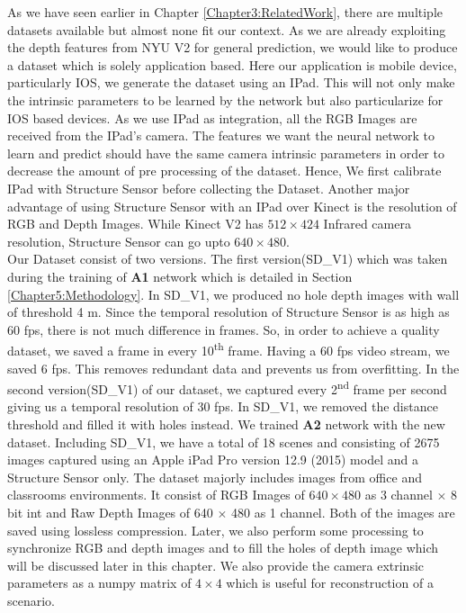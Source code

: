 As we have seen earlier in Chapter \ref{Chapter3:RelatedWork}, there are multiple datasets available but almost none fit our context. As we are already exploiting the depth features from NYU V2 for general prediction, we would like to produce a dataset which is solely application based. Here our application is mobile device, particularly IOS, we generate the dataset using an IPad. This will not only make the intrinsic parameters to be learned by the network but also particularize for IOS based devices. As we use IPad as integration, all the RGB Images are received from the IPad's camera. The features we want the neural network to learn and predict should have the same camera intrinsic parameters in order to decrease the amount of pre processing of the dataset. Hence, We first calibrate IPad with Structure Sensor before collecting the Dataset. Another major advantage of using Structure Sensor with an IPad over Kinect is the resolution of RGB and Depth Images. While Kinect V2 has $512\times424$ Infrared camera resolution, Structure Sensor can go upto $640\times480$. \\

Our Dataset consist of two versions. The first version(SD\_V1) which was taken during the training of \textbf{A1} network which is detailed in Section \ref{Chapter5:Methodology}. In SD\_V1, we produced no hole depth images with wall of threshold 4 m. Since the temporal resolution of Structure Sensor is as high as 60 fps, there is not much difference in frames. So, in order to achieve a quality dataset, we saved a frame in every 10\textsuperscript{th} frame. Having a 60 fps video stream, we saved 6 fps. This removes redundant data and prevents us from overfitting. In the second version(SD\_V1) of our dataset, we captured every 2\textsuperscript{nd} frame per second giving us a temporal resolution of 30 fps. In SD\_V1, we removed the distance threshold and filled it with holes instead. We trained \textbf{A2} network with the new dataset. Including SD\_V1, we have a total of 18 scenes and consisting of 2675 images captured using an Apple iPad Pro version 12.9 (2015) model and a Structure Sensor only. The dataset majorly includes images from office and classrooms environments. It consist of RGB Images of $640\times480$ as 3 channel $\times$ 8 bit int and Raw Depth Images of 640 $\times$ 480 as 1 channel. Both of the images are saved using lossless compression. Later, we also perform some processing to synchronize RGB and depth images and to fill the holes of depth image which will be discussed later in this chapter. We also provide the camera extrinsic parameters as a numpy matrix of $4\times4$ which is useful for reconstruction of a scenario.\\


